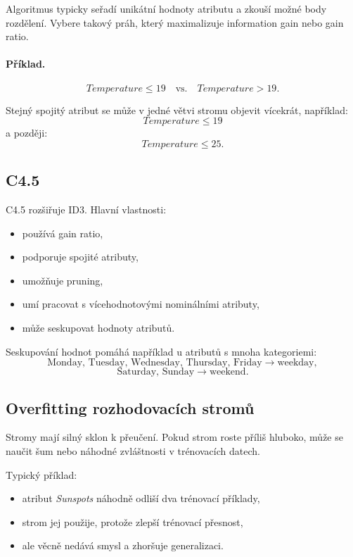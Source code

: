 Algoritmus typicky seřadí unikátní hodnoty atributu a zkouší možné body rozdělení. Vybere takový práh, který
maximalizuje information gain nebo gain ratio.

\paragraph{Příklad.}
\[
Temperature \leq 19
\quad
\text{vs.}
\quad
Temperature > 19.
\]

Stejný spojitý atribut se může v jedné větvi stromu objevit vícekrát, například:
\[
Temperature \leq 19
\]
a později:
\[
Temperature \leq 25.
\]

\subsection{C4.5}

C4.5 rozšiřuje ID3. Hlavní vlastnosti:
\begin{itemize}
    \item používá gain ratio,
    \item podporuje spojité atributy,
    \item umožňuje pruning,
    \item umí pracovat s vícehodnotovými nominálními atributy,
    \item může seskupovat hodnoty atributů.
\end{itemize}

Seskupování hodnot pomáhá například u atributů s mnoha kategoriemi:
\[
\text{Monday, Tuesday, Wednesday, Thursday, Friday}
\rightarrow
\text{weekday},
\]
\[
\text{Saturday, Sunday}
\rightarrow
\text{weekend}.
\]

\subsection{Overfitting rozhodovacích stromů}

Stromy mají silný sklon k přeučení. Pokud strom roste příliš hluboko, může se naučit šum nebo náhodné
zvláštnosti v trénovacích datech.

Typický příklad:
\begin{itemize}
    \item atribut \textit{Sunspots} náhodně odliší dva trénovací příklady,
    \item strom jej použije, protože zlepší trénovací přesnost,
    \item ale věcně nedává smysl a zhoršuje generalizaci.
\end{itemize}

